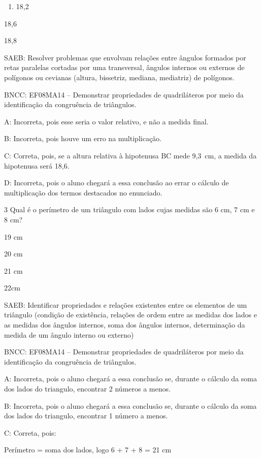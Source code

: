 {\begin{enumerate}
\def\labelenumi{\alph{enumi})}
\setcounter{enumi}{1}
\tightlist
\item
  18,2
\end{enumerate}
\item 18,6
\item 18,8

SAEB: Resolver problemas que envolvam relações entre ângulos formados
por retas paralelas cortadas por uma transversal, ângulos internos ou
externos de polígonos ou cevianas (altura, bissetriz, mediana,
mediatriz) de polígonos.

BNCC: EF08MA14 -- Demonstrar propriedades de quadriláteros por meio da
identificação da congruência de triângulos.

A: Incorreta, pois esse seria o valor relativo, e não a medida final.

B: Incorreta, pois houve um erro na multiplicação.

C: Correta, pois, se a altura relativa à hipotenusa BC mede 9,3~cm, a
medida da hipotenusa será 18,6.

D: Incorreta, pois o aluno chegará a essa conclusão ao errar o cálculo
de multiplicação dos termos destacados no enunciado.

\num{3} Qual é o perímetro de um triângulo com lados cujas medidas são 6 cm,
7 cm e 8 cm?
\item 19 cm
\item 20 cm
\item 21 cm 
\item 22cm



SAEB: Identificar propriedades e relações existentes entre os elementos
de um triângulo (condição de existência, relações de ordem entre as
medidas dos lados e as medidas dos ângulos internos, soma dos ângulos
internos, determinação da medida de um ângulo interno ou externo)

BNCC: EF08MA14 -- Demonstrar propriedades de quadriláteros por meio da
identificação da congruência de triângulos.

A: Incorreta, pois o aluno chegará a essa conclusão se, durante o
cálculo da soma dos lados do triangulo, encontrar 2 números a menos.

B: Incorreta, pois o aluno chegará a essa conclusão se, durante o
cálculo da soma dos lados do triangulo, encontrar 1 número a menos.

C: Correta, pois:

Perímetro = soma dos lados, logo 6 + 7 + 8 = 21 cm

}
